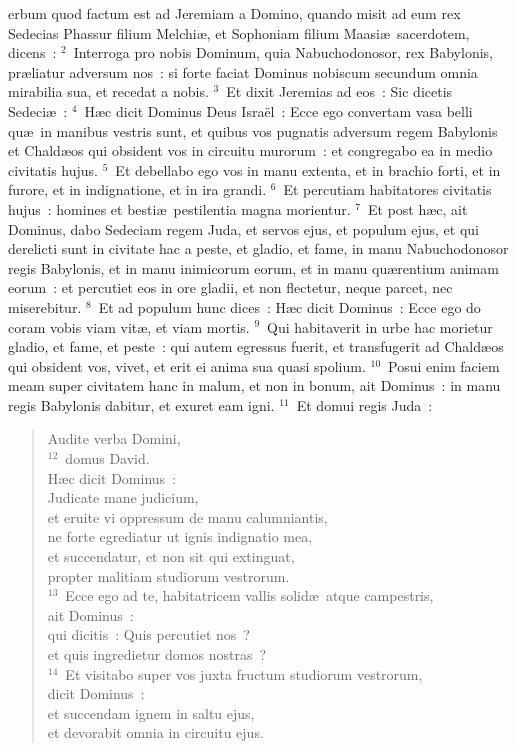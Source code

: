 \bchapter
{}erbum quod factum est ad Jeremiam a Domino, quando misit ad eum rex Sedecias Phassur filium Melchi\ae , et Sophoniam filium Maasi\ae\ sacerdotem, dicens~:
${}^{2}$~Interroga pro nobis Dominum, quia Nabuchodonosor, rex Babylonis, pr\ae liatur adversum nos~: si forte faciat Dominus nobiscum secundum omnia mirabilia sua, et recedat a nobis.
${}^{3}$~Et dixit Jeremias ad eos~: Sic dicetis Sedeci\ae~:
${}^{4}$~H\ae c dicit Dominus Deus Isra\"el~: Ecce ego convertam vasa belli qu\ae\ in manibus vestris sunt, et quibus vos pugnatis adversum regem Babylonis et Chald\ae os qui obsident vos in circuitu murorum~: et congregabo ea in medio civitatis hujus.
${}^{5}$~Et debellabo ego vos in manu extenta, et in brachio forti, et in furore, et in indignatione, et in ira grandi.
${}^{6}$~Et percutiam habitatores civitatis hujus~: homines et besti\ae\ pestilentia magna morientur.
${}^{7}$~Et post h\ae c, ait Dominus, dabo Sedeciam regem Juda, et servos ejus, et populum ejus, et qui derelicti sunt in civitate hac a peste, et gladio, et fame, in manu Nabuchodonosor regis Babylonis, et in manu inimicorum eorum, et in manu qu\ae rentium animam eorum~: et percutiet eos in ore gladii, et non flectetur, neque parcet, nec miserebitur.
${}^{8}$~Et ad populum hunc dices~: H\ae c dicit Dominus~: Ecce ego do coram vobis viam vit\ae , et viam mortis.
${}^{9}$~Qui habitaverit in urbe hac morietur gladio, et fame, et peste~: qui autem egressus fuerit, et transfugerit ad Chald\ae os qui obsident vos, vivet, et erit ei anima sua quasi spolium.
${}^{10}$~Posui enim faciem meam super civitatem hanc in malum, et non in bonum, ait Dominus~: in manu regis Babylonis dabitur, et exuret eam igni.
${}^{11}$~Et domui regis Juda~: \begin{verse}Audite verba Domini,\\
${}^{12}$~domus David.\\ H\ae c dicit Dominus~:\\ Judicate mane judicium,\\ et eruite vi oppressum de manu calumniantis,\\ ne forte egrediatur ut ignis indignatio mea,\\ et succendatur, et non sit qui extinguat,\\ propter malitiam studiorum vestrorum.\\
${}^{13}$~Ecce ego ad te, habitatricem vallis solid\ae\ atque campestris,\\ ait Dominus~:\\ qui dicitis~: Quis percutiet nos~?\\ et quis ingredietur domos nostras~?\\
${}^{14}$~Et visitabo super vos juxta fructum studiorum vestrorum,\\ dicit Dominus~:\\ et succendam ignem in saltu ejus,\\ et devorabit omnia in circuitu ejus.\end{verse}




